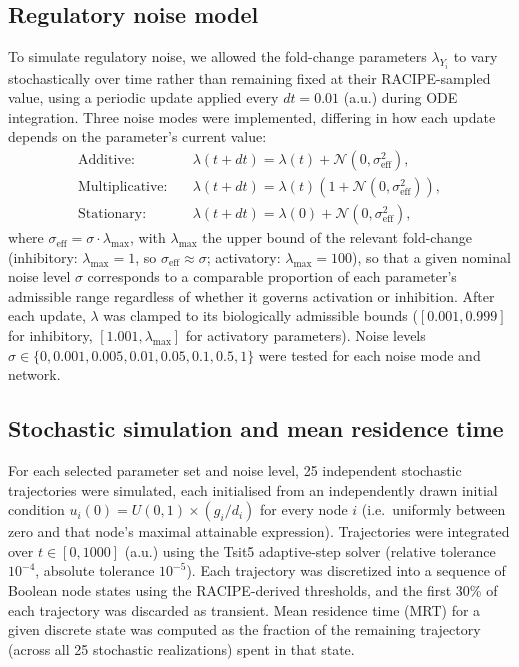 \documentclass[11pt]{article}
\begin{document}
\subsection{Regulatory noise model} \label{sec:noise}

To simulate regulatory noise, we allowed the fold-change parameters $\lambda_{Y_i}$ to vary stochastically over time rather than remaining fixed at their RACIPE-sampled value, using a periodic update applied every $dt = 0.01$ (a.u.) during ODE integration. Three noise modes were implemented, differing in how each update depends on the parameter's current value:
\begin{align}
\text{Additive:} \quad & \lambda(t+dt) = \lambda(t) + \mathcal{N}(0, \sigma_{\text{eff}}^2), \\
\text{Multiplicative:} \quad & \lambda(t+dt) = \lambda(t)\left(1 + \mathcal{N}(0, \sigma_{\text{eff}}^2)\right), \\
\text{Stationary:} \quad & \lambda(t+dt) = \lambda(0) + \mathcal{N}(0, \sigma_{\text{eff}}^2),
\end{align}
where $\sigma_{\text{eff}} = \sigma \cdot \lambda_{\max}$, with $\lambda_{\max}$ the upper bound of the relevant fold-change (inhibitory: $\lambda_{\max} = 1$, so $\sigma_{\text{eff}} \approx \sigma$; activatory: $\lambda_{\max} = 100$), so that a given nominal noise level $\sigma$ corresponds to a comparable proportion of each parameter's admissible range regardless of whether it governs activation or inhibition. After each update, $\lambda$ was clamped to its biologically admissible bounds ($[0.001, 0.999]$ for inhibitory, $[1.001, \lambda_{\max}]$ for activatory parameters). Noise levels $\sigma \in \{0, 0.001, 0.005, 0.01, 0.05, 0.1, 0.5, 1\}$ were tested for each noise mode and network.

\subsection{Stochastic simulation and mean residence time}

For each selected parameter set and noise level, 25 independent stochastic trajectories were simulated, each initialised from an independently drawn initial condition $u_i(0) = U(0,1) \times (g_i/d_i)$ for every node $i$ (i.e.\ uniformly between zero and that node's maximal attainable expression). Trajectories were integrated over $t \in [0, 1000]$ (a.u.) using the Tsit5 adaptive-step solver (relative tolerance $10^{-4}$, absolute tolerance $10^{-5}$). Each trajectory was discretized into a sequence of Boolean node states using the RACIPE-derived thresholds, and the first 30\% of each trajectory was discarded as transient. Mean residence time (MRT) for a given discrete state was computed as the fraction of the remaining trajectory (across all 25 stochastic realizations) spent in that state.
\end{document}
